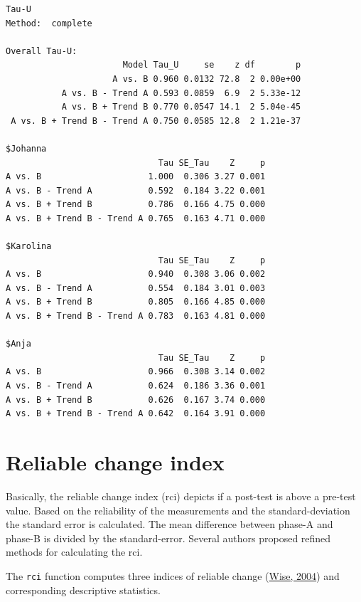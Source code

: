 \documentclass[
]{book}
\newenvironment{Shaded}{\begin{snugshade}}{\end{snugshade}}
\newcommand{\AttributeTok}[1]{\textcolor[rgb]{0.77,0.63,0.00}{#1}}
\newcommand{\ConstantTok}[1]{\textcolor[rgb]{0.00,0.00,0.00}{#1}}
\newcommand{\FloatTok}[1]{\textcolor[rgb]{0.00,0.00,0.81}{#1}}
\newcommand{\FunctionTok}[1]{\textcolor[rgb]{0.00,0.00,0.00}{#1}}
\newcommand{\NormalTok}[1]{#1}
\newcommand{\SpecialCharTok}[1]{\textcolor[rgb]{0.00,0.00,0.00}{#1}}
\begin{document}
\begin{verbatim}
Tau-U
Method:  complete 

Overall Tau-U: 
                       Model Tau_U     se    z df        p
                     A vs. B 0.960 0.0132 72.8  2 0.00e+00
           A vs. B - Trend A 0.593 0.0859  6.9  2 5.33e-12
           A vs. B + Trend B 0.770 0.0547 14.1  2 5.04e-45
 A vs. B + Trend B - Trend A 0.750 0.0585 12.8  2 1.21e-37

$Johanna
                              Tau SE_Tau    Z     p
A vs. B                     1.000  0.306 3.27 0.001
A vs. B - Trend A           0.592  0.184 3.22 0.001
A vs. B + Trend B           0.786  0.166 4.75 0.000
A vs. B + Trend B - Trend A 0.765  0.163 4.71 0.000

$Karolina
                              Tau SE_Tau    Z     p
A vs. B                     0.940  0.308 3.06 0.002
A vs. B - Trend A           0.554  0.184 3.01 0.003
A vs. B + Trend B           0.805  0.166 4.85 0.000
A vs. B + Trend B - Trend A 0.783  0.163 4.81 0.000

$Anja
                              Tau SE_Tau    Z     p
A vs. B                     0.966  0.308 3.14 0.002
A vs. B - Trend A           0.624  0.186 3.36 0.001
A vs. B + Trend B           0.626  0.167 3.74 0.000
A vs. B + Trend B - Trend A 0.642  0.164 3.91 0.000
\end{verbatim}

\hypertarget{reliable-change-index}{%
\section{Reliable change index}\label{reliable-change-index}}

Basically, the reliable change index (rci) depicts if a post-test is above a pre-test value. Based on the reliability of the measurements and the standard-deviation the standard error is calculated. The mean difference between phase-A and phase-B is divided by the standard-error. Several authors proposed refined methods for calculating the rci.

The \texttt{rci} function computes three indices of reliable change (\protect\hyperlink{ref-wise_methods_2004}{Wise, 2004}) and corresponding descriptive statistics.

\begin{Shaded}
\end{Shaded}
\end{document}
